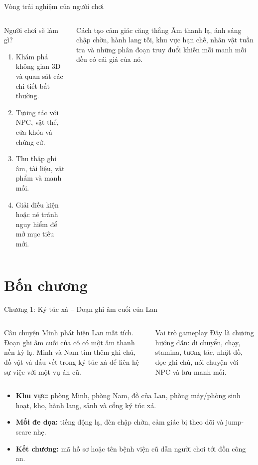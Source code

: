 \documentclass[aspectratio=169,10pt]{beamer}
\begin{document}
\begin{frame}{Vòng trải nghiệm của người chơi}
  \begin{columns}[T,onlytextwidth]
    \begin{block}{Người chơi sẽ làm gì?}
      \begin{enumerate}
        \item Khám phá không gian 3D và quan sát các chi tiết bất thường.
        \item Tương tác với NPC, vật thể, cửa khóa và chứng cứ.
        \item Thu thập ghi âm, tài liệu, vật phẩm và manh mối.
        \item Giải điều kiện hoặc né tránh nguy hiểm để mở mục tiêu mới.
      \end{enumerate}
    \end{block}
    \begin{alertblock}{Cách tạo cảm giác căng thẳng}
      Âm thanh lạ, ánh sáng chập chờn, hành lang tối, khu vực hạn chế, nhân vật tuần tra và những phân đoạn truy đuổi khiến mỗi manh mối đều có cái giá của nó.
    \end{alertblock}
  \end{columns}
\end{frame}

\section{Bốn chương}
\begin{frame}{Chương 1: Ký túc xá -- Đoạn ghi âm cuối của Lan}
  \begin{columns}[T,onlytextwidth]
    \begin{block}{Câu chuyện}
      Minh phát hiện Lan mất tích. Đoạn ghi âm cuối của cô có một âm thanh nền kỳ lạ. Minh và Nam tìm thêm ghi chú, đồ vật và dấu vết trong ký túc xá để liên hệ sự việc với một vụ án cũ.
    \end{block}
    \begin{block}{Vai trò gameplay}
      Đây là chương hướng dẫn: di chuyển, chạy, stamina, tương tác, nhặt đồ, đọc ghi chú, nói chuyện với NPC và lưu manh mối.
    \end{block}
  \end{columns}

  \vspace{0.2cm}
  \begin{itemize}
    \item \textbf{Khu vực:} phòng Minh, phòng Nam, đồ của Lan, phòng máy/phòng sinh hoạt, kho, hành lang, sảnh và cổng ký túc xá.
    \item \textbf{Mối đe dọa:} tiếng động lạ, đèn chập chờn, cảm giác bị theo dõi và jump-scare nhẹ.
    \item \textbf{Kết chương:} mã hồ sơ hoặc tên bệnh viện cũ dẫn người chơi tới đồn công an.
  \end{itemize}
\end{frame}
\end{document}
